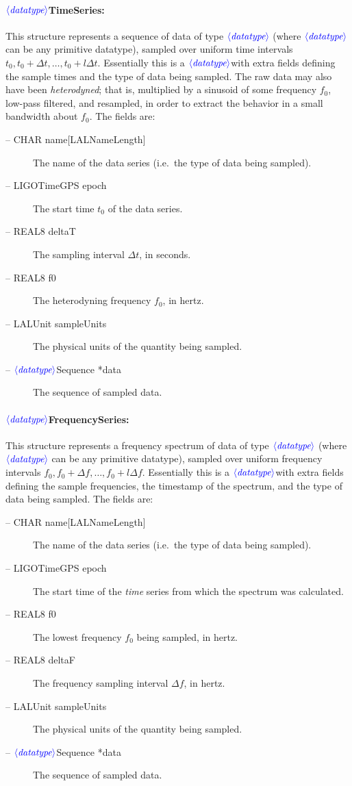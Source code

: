 \documentclass[10pt]{ligodcc}
\renewcommand{\texttt}[1]{{\ttfamily\color{blue}#1}}
\newcommand{\opt}[1]{\ensuremath{\color{blue}\langle\textit{#1}\rangle}}
\begin{document}
\paragraph{\opt{datatype}\texttt{TimeSeries}:}
This structure represents a sequence of data of type \opt{datatype}
(where \opt{datatype} can be any primitive datatype), sampled over
uniform time intervals $t_0, t_0+\Delta t, \ldots , t_0+l\Delta t$.
Essentially this is a \opt{datatype}\verb@Sequence@ with extra fields
defining the sample times and the type of data being sampled.  The raw
data may also have been \emph{heterodyned}; that is, multiplied by a
sinusoid of some frequency $f_0$, low-pass filtered, and resampled, in
order to extract the behavior in a small bandwidth about $f_0$.  The
fields are:
\begin{description}
\item[-- \texttt{CHAR name[LALNameLength]}] The name of the data series (i.e.\
the type of data being sampled).
\item[-- \texttt{LIGOTimeGPS epoch}] The start time $t_0$ of the data
series.
\item[-- \texttt{REAL8 deltaT}] The sampling interval $\Delta t$, in
seconds.
\item[-- \texttt{REAL8 f0}] The heterodyning frequency $f_0$, in hertz.
\item[-- \texttt{LALUnit sampleUnits}] The physical units of the
quantity being sampled.
\item[-- \opt{datatype}\texttt{Sequence *data}] The sequence of sampled data.
\end{description}


\paragraph{\opt{datatype}\texttt{FrequencySeries}:}
This structure represents a frequency spectrum of data of type
\opt{datatype} (where \opt{datatype} can be any primitive
datatype), sampled over uniform frequency intervals $f_0, f_0+\Delta
f, \ldots , f_0+l\Delta f$.  Essentially this is a
\opt{datatype}\verb@Sequence@ with extra fields defining the sample
frequencies, the timestamp of the spectrum, and the type of data being
sampled.  The fields are:
\begin{description}
\item[-- \texttt{CHAR name[LALNameLength]}] The name of the data series (i.e.\
the type of data being sampled).
\item[-- \texttt{LIGOTimeGPS epoch}] The start time of the \emph{time}
series from which the spectrum was calculated.
\item[-- \texttt{REAL8 f0}] The lowest frequency $f_0$ being sampled, in
hertz.
\item[-- \texttt{REAL8 deltaF}] The frequency sampling interval $\Delta
f$, in hertz.
\item[-- \texttt{LALUnit sampleUnits}] The physical units of the
quantity being sampled.
\item[-- \opt{datatype}\texttt{Sequence *data}] The sequence of sampled data.
\end{description}
\end{document}
